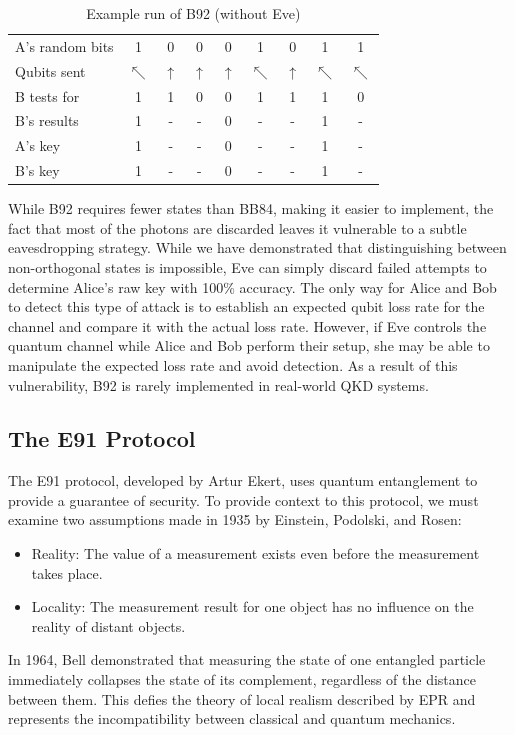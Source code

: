 \documentclass[conference]{IEEEtran}
\begin{document}
\begin{table}[h]
  \caption{Example run of B92 (without Eve)}
  \begin{center}
    \begin{tabular}{|l|c c c c c c c c|}
      \hline
      A's random bits & 1 & 0 & 0 & 0 & 1 & 0 & 1 & 1\\
      Qubits sent & $\nwarrow$ & $\uparrow$ & $\uparrow$ & $\uparrow$ & $\nwarrow$ & $\uparrow$ & $\nwarrow$ & $\nwarrow$\\
      B tests for     & 1 & 1 & 0 & 0 & 1 & 1 & 1 & 0\\
      B's results     & 1 & - & - & 0 & - & - & 1 & -\\
      \hline
      A's key         & 1 & - & - & 0 & - & - & 1 & -\\
      B's key         & 1 & - & - & 0 & - & - & 1 & -\\
      \hline
    \end{tabular}
  \end{center}
\end{table}

While B92 requires fewer states than BB84, making it easier to implement, the fact that most of the photons are discarded leaves it vulnerable to a subtle eavesdropping strategy. While we have demonstrated that distinguishing between non-orthogonal states is impossible, Eve can simply discard failed attempts to determine Alice's raw key with 100\% accuracy\cite{Williams}. The only way for Alice and Bob to detect this type of attack is to establish an expected qubit loss rate for the channel and compare it with the actual loss rate. However, if Eve controls the quantum channel while Alice and Bob perform their setup, she may be able to manipulate the expected loss rate and avoid detection. As a result of this vulnerability, B92 is rarely implemented in real-world QKD systems.\\

\subsection{The E91 Protocol}
The E91 protocol, developed by Artur Ekert\cite{E91}, uses quantum entanglement to provide a guarantee of security. To provide context to this protocol, we must examine two assumptions made in 1935 by Einstein, Podolski, and Rosen\cite{EPR}:
\begin{itemize}
\item Reality: The value of a measurement exists even before the measurement takes place.
\item Locality: The measurement result for one object has no influence on the reality of distant objects.
\end{itemize}
In 1964, Bell demonstrated that measuring the state of one entangled particle immediately collapses the state of its complement, regardless of the distance between them\cite{Bell}. This defies the theory of local realism described by EPR and represents the incompatibility between classical and quantum mechanics.\\
\end{document}
